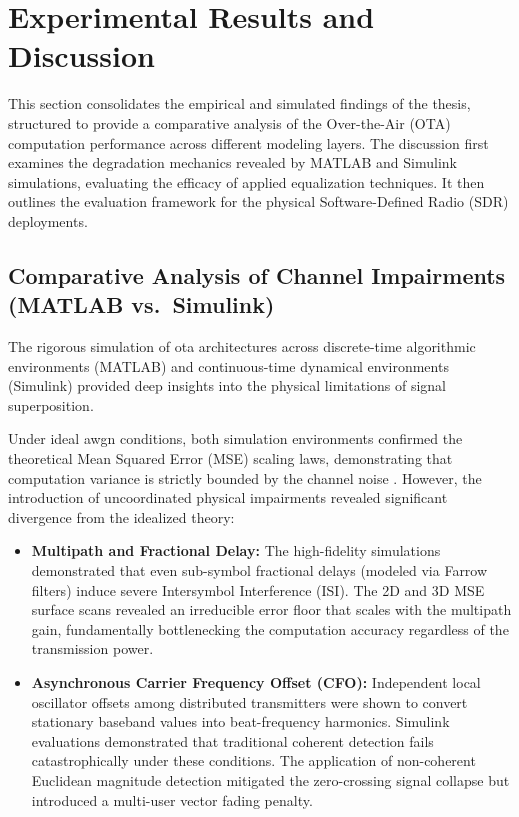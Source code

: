 \documentclass[Markos_Delaportas_1316.tex]{subfiles}
\begin{document}
\section{Experimental Results and Discussion}
This section consolidates the empirical and simulated findings of the
thesis, structured
to provide a comparative analysis of the Over-the-Air (OTA)
computation performance across
different modeling layers. The discussion first examines the
degradation mechanics revealed
by MATLAB and Simulink simulations, evaluating the efficacy of
applied equalization techniques.
It then outlines the evaluation framework for the physical
Software-Defined Radio (SDR)
deployments.

\subsection{Comparative Analysis of Channel Impairments (MATLAB vs.\ Simulink)}
The rigorous simulation of \gls{ota} architectures across
discrete-time algorithmic environments
(MATLAB) and continuous-time dynamical environments (Simulink)
provided deep insights into
the physical limitations of signal superposition.

Under ideal \gls{awgn} conditions, both simulation environments
confirmed the theoretical Mean
Squared Error (MSE) scaling laws, demonstrating that computation
variance is strictly bounded
by the channel noise \cite{sahin_survey_2023}. However, the
introduction of uncoordinated
physical impairments revealed significant divergence from the idealized theory:
\begin{itemize}
    \item \textbf{Multipath and Fractional Delay:} The high-fidelity
        simulations demonstrated that even sub-symbol fractional
        delays (modeled via Farrow filters) induce severe Intersymbol
        Interference (ISI). The 2D and 3D MSE surface scans revealed
        an irreducible error floor that scales with the multipath
        gain, fundamentally bottlenecking the computation accuracy
        regardless of the transmission power.
    \item \textbf{Asynchronous Carrier Frequency Offset (CFO):}
        Independent local oscillator offsets among distributed
        transmitters were shown to convert stationary baseband values
        into beat-frequency harmonics. Simulink evaluations
        demonstrated that traditional coherent detection fails
        catastrophically under these conditions. The application of
        non-coherent Euclidean magnitude detection mitigated the
        zero-crossing signal collapse but introduced a multi-user
        vector fading penalty.
\end{itemize}
\end{document}

